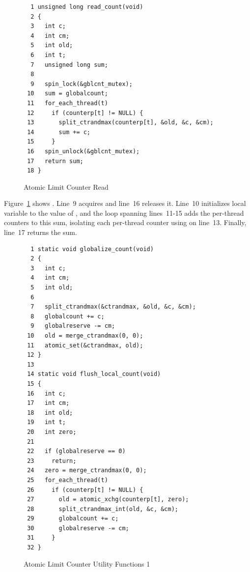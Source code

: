 \begin{figure}[tbp]
{ \scriptsize
\begin{verbatim}
  1 unsigned long read_count(void)
  2 {
  3   int c;
  4   int cm;
  5   int old;
  6   int t;
  7   unsigned long sum;
  8 
  9   spin_lock(&gblcnt_mutex);
 10   sum = globalcount;
 11   for_each_thread(t)
 12     if (counterp[t] != NULL) {
 13       split_ctrandmax(counterp[t], &old, &c, &cm);
 14       sum += c;
 15     }
 16   spin_unlock(&gblcnt_mutex);
 17   return sum;
 18 }
\end{verbatim}
}
\caption{Atomic Limit Counter Read}
\label{fig:count:Atomic Limit Counter Read}
\end{figure}

Figure~\ref{fig:count:Atomic Limit Counter Read} shows .
Line~9 acquires  and line~16 releases it.
Line~10 initializes local variable  to the value of
, and the loop spanning lines~11-15 adds the
per-thread counters to this sum, isolating each per-thread counter
using  on line~13.
Finally, line~17 returns the sum.

\begin{figure}[tbp]
{ \scriptsize
\begin{verbatim}
  1 static void globalize_count(void)
  2 {
  3   int c;
  4   int cm;
  5   int old;
  6 
  7   split_ctrandmax(&ctrandmax, &old, &c, &cm);
  8   globalcount += c;
  9   globalreserve -= cm;
 10   old = merge_ctrandmax(0, 0);
 11   atomic_set(&ctrandmax, old);
 12 }
 13 
 14 static void flush_local_count(void)
 15 {
 16   int c;
 17   int cm;
 18   int old;
 19   int t;
 20   int zero;
 21 
 22   if (globalreserve == 0)
 23     return;
 24   zero = merge_ctrandmax(0, 0);
 25   for_each_thread(t)
 26     if (counterp[t] != NULL) {
 27       old = atomic_xchg(counterp[t], zero);
 28       split_ctrandmax_int(old, &c, &cm);
 29       globalcount += c;
 30       globalreserve -= cm;
 31     }
 32 }
\end{verbatim}
}
\caption{Atomic Limit Counter Utility Functions 1}
\label{fig:count:Atomic Limit Counter Utility Functions 1}
\end{figure}

